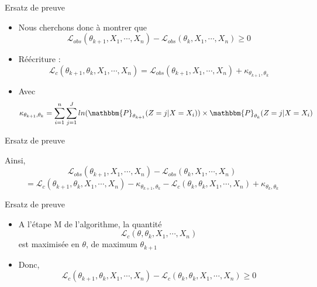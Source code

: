 \documentclass[11pt]{beamer}
\begin{document}
	\begin{frame}{Ersatz de preuve}
		\begin{block}{}
			\begin{itemize}
				\item Nous cherchons donc à montrer que
				\[
				\mathcal{L}_{obs}(\theta_{k+1}, X_1, \cdots, X_n) - \mathcal{L}_{obs}(\theta_k, X_1, \cdots, X_n) \geq 0
				\]
				\item Réécriture :
				\[
				\mathcal{L}_c(\theta_{k+1}, \theta_k, X_1, \cdots, X_n) = \mathcal{L}_{obs}(\theta_{k+1}, X_1, \cdots, X_n) + \kappa_{\theta_{k+1},\theta_k}
				\]
				\item Avec
					\[
					 \kappa_{\theta_{k+1},\theta_k} = \sum_{i=1}^n\sum_{j=1}^J ln(\mathbbm{P}_{\theta_{k+1}}(Z = j|X=X_i))\times\mathbbm{P}_{\theta_k}(Z = j|X = X_i)
					\]
			\end{itemize}	
		\end{block}
	\end{frame}

	\begin{frame}{Ersatz de preuve}
		\begin{block}{}
				Ainsi,
				\[
				\mathcal{L}_{obs}(\theta_{k+1}, X_1, \cdots, X_n) - \mathcal{L}_{obs}(\theta_k, X_1, \cdots, X_n)
				\]
				\[
				= \mathcal{L}_c(\theta_{k+1}, \theta_k, X_1, \cdots, X_n) - \kappa_{\theta_{k+1}, \theta_k} - \mathcal{L}_c(\theta_k, \theta_k, X_1, \cdots, X_n) + \kappa_{\theta_{k}, \theta_k}
				\]
		\end{block}
	\end{frame}


	\begin{frame}{Ersatz de preuve}
		\begin{block}{}
			\begin{itemize}
				\item A l'étape M de l'algorithme, la quantité 
					\[
					\mathcal{L}_c(\theta, \theta_k, X_1, \cdots, X_n)
					\]
est maximisée en $\theta$, de maximum $\theta_{k+1}$
				\item Donc,
					\[
					\mathcal{L}_c(\theta_{k+1}, \theta_k, X_1, \cdots, X_n) - \mathcal{L}_c(\theta_k, \theta_k, X_1, \cdots, X_n) \geq 0
					\]
			\end{itemize}
		\end{block}
	\end{frame}
\end{document}
